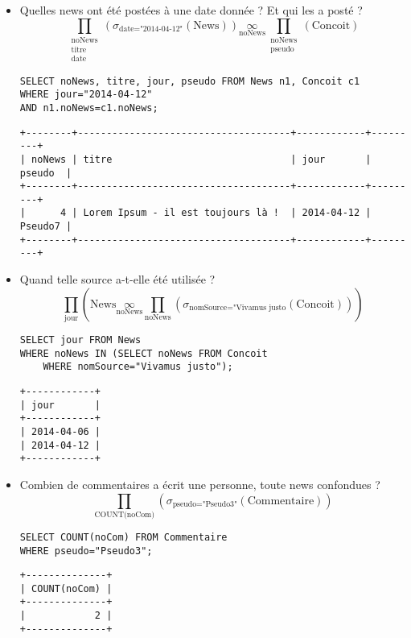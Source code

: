 \begin{itemize}
	\item Quelles news ont été postées à une date donnée ? Et qui les a posté ?
	\[\prod_{\begin{array}{c}\text{noNews}\\ \text{titre}\\ \text{date}\end{array}}\left(\sigma_{\text{date="2014-04-12"}}(\text{News})\right)\underset{\text{noNews}}{\infty} \prod_{\begin{array}{c} \text{noNews}\\ \text{pseudo}\end{array}} (\text{Concoit})\]
	\begin{verbatim}
SELECT noNews, titre, jour, pseudo FROM News n1, Concoit c1
WHERE jour="2014-04-12"
AND n1.noNews=c1.noNews;
	\end{verbatim}
\begin{verbatim}
+--------+-------------------------------------+------------+---------+
| noNews | titre                               | jour       | pseudo  |
+--------+-------------------------------------+------------+---------+
|      4 | Lorem Ipsum - il est toujours là !  | 2014-04-12 | Pseudo7 |
+--------+-------------------------------------+------------+---------+
\end{verbatim}

	\item Quand telle source a-t-elle été utilisée ?
	\[\prod_{\text{jour}}\left(\text{News} \underset{\text{noNews}}{\infty} \prod_{\text{noNews}}\left( \sigma_{\text{nomSource="Vivamus justo}} (\text{Concoit})\right)\right)\]
	\begin{verbatim}
SELECT jour FROM News
WHERE noNews IN (SELECT noNews FROM Concoit
	WHERE nomSource="Vivamus justo");
	\end{verbatim}
\begin{verbatim}
+------------+
| jour       |
+------------+
| 2014-04-06 |
| 2014-04-12 |
+------------+
\end{verbatim}
	
	\item Combien de commentaires a écrit une personne, toute news confondues ?
	\[\prod_{\text{COUNT(noCom)}}\left(\sigma_{\text{pseudo="Pseudo3"}}(\text{Commentaire})\right)\]
	\begin{verbatim}
SELECT COUNT(noCom) FROM Commentaire
WHERE pseudo="Pseudo3";
	\end{verbatim}
\begin{verbatim}
+--------------+
| COUNT(noCom) |
+--------------+
|            2 |
+--------------+
\end{verbatim}


\end{itemize}
